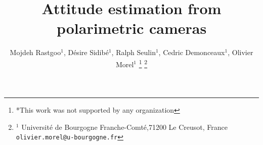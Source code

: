 \title{\LARGE \bf
Attitude estimation from polarimetric cameras}


\author{Mojdeh Rastgoo$^{1}$, D\'esire Sidib\'e$^{1}$, Ralph Seulin$^{1}$, Cedric Demonceaux$^{1}$, Olivier Morel$^{1}$  %
\thanks{*This work was not supported by any organization}%
\thanks{$^{1}$ Universit\'e de Bourgogne Franche-Comt\'e,71200 Le Creusot, France
       {\tt\small olivier.morel@u-bourgogne.fr}}
}
